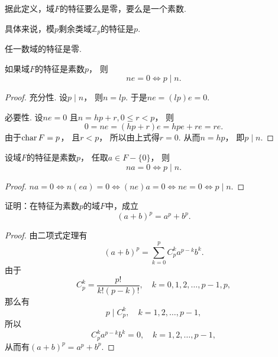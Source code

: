 据此定义，域\(F\)的特征要么是零，要么是一个素数.

具体来说，模\(p\)剩余类域\(\mathbb{Z}_p\)的特征是\(p\).

任一数域的特征是零.

\begin{corollary}\label{theorem:域的特征.特征为p的域的性质1}
如果域\(F\)的特征是素数\(p\)，
则\begin{equation*}
	ne=0
	\iff
	p \mid n.
\end{equation*}
\begin{proof}
充分性.
设\(p \mid n\)，
则\(n=lp\).
于是\(ne
=(lp)e
=0\).

必要性.
设\(ne=0\)
且\(n=hp+r,0\leq r<p\)，
则\begin{equation*}
	0=ne
	=(hp+r)e
	=hpe+re
	=re.
\end{equation*}
由于\(\operatorname{char} F=p\)，
且\(r<p\)，
所以由上式得\(r=0\).
从而\(n=hp\)，
即\(p \mid n\).
\end{proof}
\end{corollary}

\begin{corollary}\label{theorem:域的特征.特征为p的域的性质2}
设域\(F\)的特征是素数\(p\)，
任取\(a \in F-\{0\}\)，
则\begin{equation*}
	na=0
	\iff
	p \mid n.
\end{equation*}
\begin{proof}
\(na=0
\iff
n(ea)=0
\iff
(ne)a=0
\iff
ne=0
\iff
p \mid n\).
\end{proof}
\end{corollary}

\begin{example}\label{example:域.域上的特征恒等式}
证明：在特征为素数\(p\)的域\(F\)中，成立\begin{equation*}
	(a+b)^p = a^p + b^p.
\end{equation*}
\begin{proof}
由二项式定理有\begin{equation*}
	(a+b)^p
	= \sum_{k=0}^p C_p^k a^{p-k} b^k.
\end{equation*}
由于\begin{equation*}
	C_p^k = \frac{p!}{k!(p-k)!},
	\quad k=0,1,2,\dotsc,p-1,p,
\end{equation*}
那么有\begin{equation*}
	p \mid C_p^k,
	\quad k=1,2,\dotsc,p-1,
\end{equation*}
所以\begin{equation*}
	C_p^k a^{p-k} b^k = 0,
	\quad k=1,2,\dotsc,p-1,
\end{equation*}
从而有\((a+b)^p = a^p + b^p\).
\end{proof}
\end{example}

